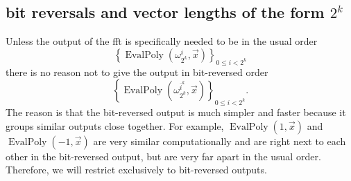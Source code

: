 \documentclass[12 pt]{amsart}
\newcommand{\om}[2] {\omega_{#1}^{#2}}
\begin{document}
\subsection{bit reversals and vector lengths of the form $2^k$}
Unless the output of the fft is specifically needed to be in the usual order
\begin{equation*}
\left\{\operatorname{EvalPoly}(\om{2^k}{i}, \vec{x})\right\}_{0 \le i < 2^k}
\end{equation*}
there is no reason not to give the output in bit-reversed order
\begin{equation*}
\left\{\operatorname{EvalPoly}(\om{2^k}{\overline{i}^k}, \vec{x})\right\}_{0 \le i < 2^k}\text{.}
\end{equation*}
The reason is that the bit-reversed output is much simpler and faster because it
groups similar outputs close together. For example, $\operatorname{EvalPoly}(1, \vec{x})$ and
$\operatorname{EvalPoly}(-1, \vec{x})$ are very similar computationally and are right next to
each other in the bit-reversed output, but are very far apart in the usual order. Therefore,
we will restrict exclusively to bit-reversed outputs.
\end{document}
